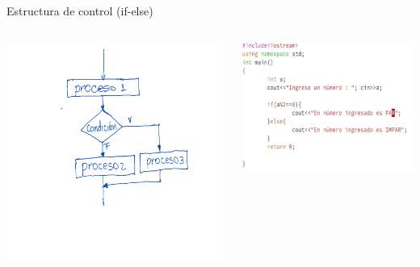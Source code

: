 \documentclass[presentation, aspectratio=54]{beamer}
\begin{document}
\begin{frame}[label={sec:org0e1347c}]{Estructura de control (if-else)}
\begin{columns}
\begin{column}{0.4\columnwidth}
\begin{center}
\includegraphics[width=.9\linewidth]{./images/codigo/ifsino2.png}
\end{center}
\end{column}

\begin{column}{0.6\columnwidth}
\begin{center}
\includegraphics[width=.9\linewidth]{./images/codigo/code-ifsino.png}
\end{center}
\end{column}
\end{columns}
\end{frame}
\end{document}
